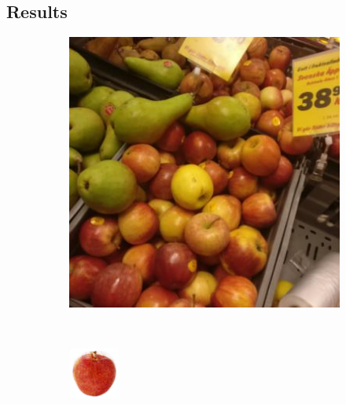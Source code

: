 \subsection{Results}

\begin{figure}[t]
	\centering
	\begin{subfigure}[b]{0.18\textwidth}
		\centering
		\includegraphics[width=\textwidth]{PaperA/decoded-image-figure/Royal-Gala-Apple_003.jpg}
		\caption{}
		\label{subfig:royal-gala-natural}
	\end{subfigure} ~
	\begin{subfigure}[b]{0.18\textwidth}
		\centering
		\includegraphics[width=\textwidth]{PaperA/decoded-image-figure/densenet_nov11/Royal-Gala-Apple_decoded.png}

\end{subfigure}
\end{figure}
